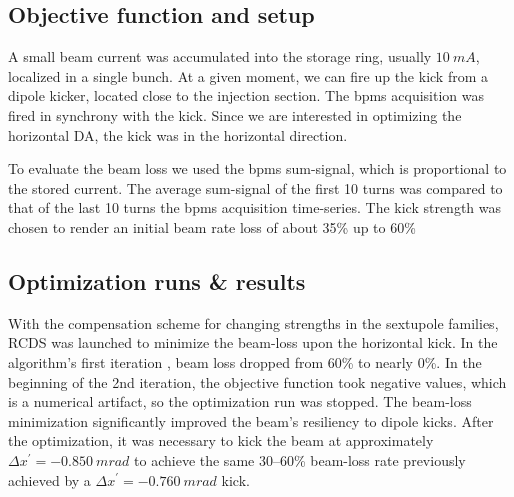 \subsection{Objective function and setup}
A small beam current was accumulated into the storage ring, usually $10~\unit{mA}$, localized in a single bunch. At a given moment, we can fire up the kick from a dipole kicker, located close to the injection section. The \glspl*{bpm} acquisition was fired in synchrony with the kick. Since we are interested in optimizing the horizontal \gls*{DA}, the kick was in the horizontal direction.

To evaluate the beam loss we used the \glspl*{bpm} sum-signal, which is proportional to the stored current. The average sum-signal of the first 10 turns was compared to that of the last 10 turns the \glspl*{bpm} acquisition time-series. The kick strength was chosen to render an initial beam rate loss of about 35\% up to 60\%
\subsection{Optimization runs \& results}
With the compensation scheme for changing strengths in the sextupole families, \gls*{RCDS} was launched to minimize the beam-loss upon the horizontal kick. In the algorithm's first iteration
, beam loss dropped from 60\% to nearly 0\%. In the beginning of the 2nd iteration, the objective function took negative values, which is a numerical artifact, so the optimization run was stopped. The beam-loss minimization significantly improved the beam's resiliency to dipole kicks. After the optimization, it was necessary to kick the beam at approximately $\Delta x^\prime=-0.850~\unit{m rad}$ to achieve the same  30--60\% beam-loss rate previously achieved by a $\Delta x^\prime=-0.760~\unit{m rad}$ kick.

